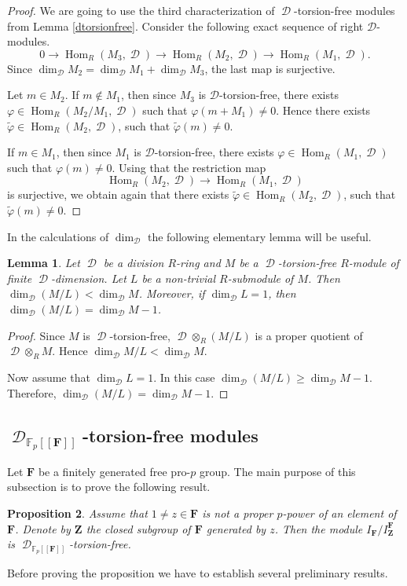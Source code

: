 \documentclass[11pt]{amsart}
\newtheorem{lem}{Lemma}[section]
\newtheorem{pro}[lem]{Proposition}
\numberwithin{claimcounter}{lem}
\DeclareMathOperator{\D}{\mathcal D}
\DeclareMathOperator{\Hom}{Hom}
\newcommand{\F}{\mathbb{F}}
\begin{document}
\begin{proof} We are going to use the third characterization of $\D$-torsion-free modules from Lemma \ref{dtorsionfree}.
Consider the following exact sequence of right $\mathcal D$-modules.
$$0\to \Hom_R(M_3,\D)\to \Hom_R(M_2,\D)\to \Hom_R(M_1,\D).$$
Since $\dim_{\D} M_2= \dim_{\D} M_1+\dim_{\D} M_3$, the last map is surjective.
 
Let $m\in M_2$. If $m\not \in M_1$, then since $M_3$ is $\mathcal D$-torsion-free, there exists $\varphi \in \Hom_R(M_2/M_1, \D)$ such that $\varphi(m+M_1)\ne 0$. Hence 
there exists   $\widetilde \varphi\in  \Hom_R(M_2,\D) $, such that $\widetilde \varphi(m)\ne 0$.

If $m\in M_1$,  then since $M_1$ is $\mathcal D$-torsion-free, there exists $\varphi \in \Hom_R(M_1, \D)$ such that $\varphi(m)\ne 0$.  Using that  the restriction map 
$$ \Hom_R(M_2,\D)\to \Hom_R(M_1,\D)$$ is surjective, we obtain again that there exists $\widetilde \varphi\in  \Hom_R(M_2,\D) $, such that $\widetilde \varphi(m)\ne 0$.\end{proof}
In the calculations of $\dim_{\D}$  the following elementary lemma will be useful.

\begin{lem}\label{-1}
Let $\D$ be a division $R$-ring and $M$ be a $\D$-torsion-free $R$-module of finite $\D$-dimension.   Let $L$ be a non-trivial $R$-submodule of $M$. Then  $\dim_{\D} (M/L)<\dim_{\D} M$. Moreover, if  $\dim_{\D} L=1$, then $\dim_{\D} (M/L)=\dim_{\D} M-1$.
\end{lem}
\begin{proof}
Since $M$ is  $\D$-torsion-free, $\D\otimes_R (M/L)$ is a proper quotient of $\D\otimes_R M$. Hence $\dim_{\D} M/L<\dim_{\D} M$. 

Now assume that  $\dim_{\D} L=1$. In this case $\dim_{\D} (M/L)\ge \dim_{\D} M-1$. Therefore,  $\dim_{\D} (M/L)=\dim_{\D} M-1$.\end{proof}


\subsection{$\D_{\F_p[[\mathbf F]]}$-torsion-free modules}
Let $\mathbf F$ be a finitely generated free pro-$p$ group.
The main purpose of this subsection is to prove the following result.
\begin{pro}\label{dffree} Assume that  $1\ne z\in \mathbf F$ is not a proper $p$-power of an element of $\mathbf F$. Denote by $\mathbf Z$ the closed subgroup of $\mathbf F$ generated by $z$. Then the  module $I_{\mathbf F}/I_\mathbf Z^{\mathbf F}$ is $\D_{\F_p[[\mathbf F]]}$-torsion-free.
\end{pro}
Before proving the proposition we have to establish several preliminary results. 
\end{document}
